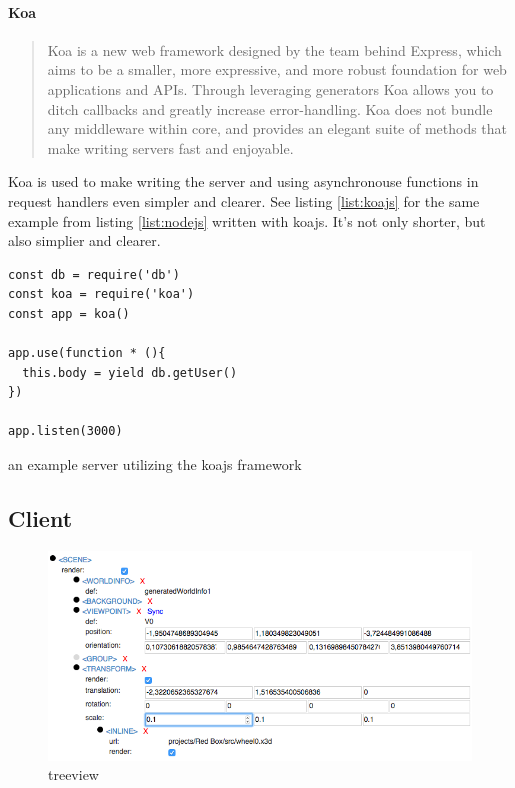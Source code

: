 \paragraph{Koa}
\label{par:Koa}
\begin{quote}
  Koa is a new web framework designed by the team behind Express, which aims to be a smaller, more expressive, and more robust foundation for web applications and APIs. Through leveraging generators Koa allows you to ditch callbacks and greatly increase error-handling. Koa does not bundle any middleware within core, and provides an elegant suite of methods that make writing servers fast and enjoyable. \cite{koajs}
\end{quote}

Koa is used to make writing the server and using asynchronouse functions in request handlers even simpler and clearer.
See listing \ref{list:koajs} for the same example from listing \ref{list:nodejs} written with koajs.
It's not only shorter, but also simplier and clearer.

\begin{listing}
  \begin{verbatim}
const db = require('db')
const koa = require('koa')
const app = koa()

app.use(function * (){
  this.body = yield db.getUser()
})

app.listen(3000)
  \end{verbatim}
  \caption{an example server utilizing the koajs framework}
  \label{list:koajs}
\end{listing}

\subsection{Client}
\label{client}

\begin{figure}
  \centering
  \includegraphics[width=12cm]{../assets/treeview.png}
  \caption{treeview}
  \label{fig:tree-view}
\end{figure}

